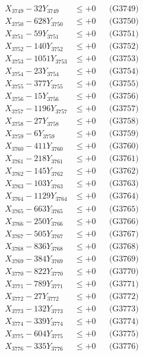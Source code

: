 \documentclass[a4paper,10pt]{article}
\begin{document}
{\begin{align}
X_{3749} - 32Y_{3749} &\leq +0 && \text{(G3749)} \\
X_{3750} - 628Y_{3750} &\leq +0 && \text{(G3750)} \\
\allowbreak
X_{3751} - 59Y_{3751} &\leq +0 && \text{(G3751)} \\
X_{3752} - 140Y_{3752} &\leq +0 && \text{(G3752)} \\
X_{3753} - 1051Y_{3753} &\leq +0 && \text{(G3753)} \\
X_{3754} - 23Y_{3754} &\leq +0 && \text{(G3754)} \\
X_{3755} - 377Y_{3755} &\leq +0 && \text{(G3755)} \\
X_{3756} - 15Y_{3756} &\leq +0 && \text{(G3756)} \\
X_{3757} - 1196Y_{3757} &\leq +0 && \text{(G3757)} \\
X_{3758} - 27Y_{3758} &\leq +0 && \text{(G3758)} \\
X_{3759} - 6Y_{3759} &\leq +0 && \text{(G3759)} \\
X_{3760} - 411Y_{3760} &\leq +0 && \text{(G3760)} \\
\allowbreak
X_{3761} - 218Y_{3761} &\leq +0 && \text{(G3761)} \\
X_{3762} - 145Y_{3762} &\leq +0 && \text{(G3762)} \\
X_{3763} - 103Y_{3763} &\leq +0 && \text{(G3763)} \\
X_{3764} - 1129Y_{3764} &\leq +0 && \text{(G3764)} \\
X_{3765} - 663Y_{3765} &\leq +0 && \text{(G3765)} \\
X_{3766} - 250Y_{3766} &\leq +0 && \text{(G3766)} \\
X_{3767} - 505Y_{3767} &\leq +0 && \text{(G3767)} \\
X_{3768} - 836Y_{3768} &\leq +0 && \text{(G3768)} \\
X_{3769} - 384Y_{3769} &\leq +0 && \text{(G3769)} \\
X_{3770} - 822Y_{3770} &\leq +0 && \text{(G3770)} \\
\allowbreak
X_{3771} - 789Y_{3771} &\leq +0 && \text{(G3771)} \\
X_{3772} - 27Y_{3772} &\leq +0 && \text{(G3772)} \\
X_{3773} - 132Y_{3773} &\leq +0 && \text{(G3773)} \\
X_{3774} - 339Y_{3774} &\leq +0 && \text{(G3774)} \\
X_{3775} - 604Y_{3775} &\leq +0 && \text{(G3775)} \\
X_{3776} - 335Y_{3776} &\leq +0 && \text{(G3776)} \\

\end{align}}
\end{document}
